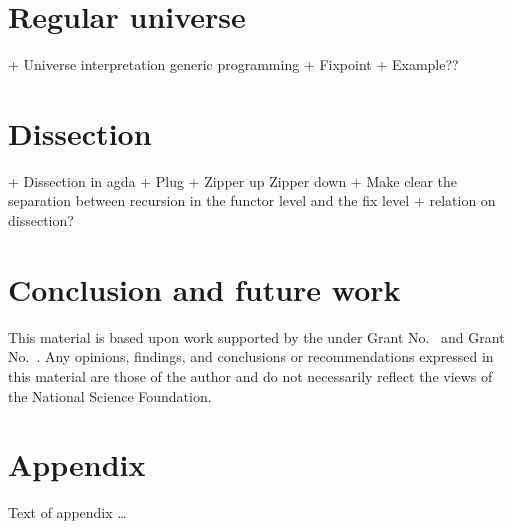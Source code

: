 \documentclass[sigplan,10pt,review]{acmart}
\begin{document}
\section{Regular universe}
  + Universe interpretation generic programming
  + Fixpoint
  + Example??
\section{Dissection}
  + Dissection in agda
  + Plug
  + Zipper up Zipper down
  + Make clear the separation between recursion in the functor level and
  the fix level
  + relation on dissection?
  
\section{Conclusion and future work}

\begin{acks}                            %
  This material is based upon work supported by the
   under Grant
  No.~ and Grant
  No.~.  Any opinions, findings, and
  conclusions or recommendations expressed in this material are those
  of the author and do not necessarily reflect the views of the
  National Science Foundation.
\end{acks}






\appendix
\section{Appendix}

Text of appendix \ldots
\end{document}
